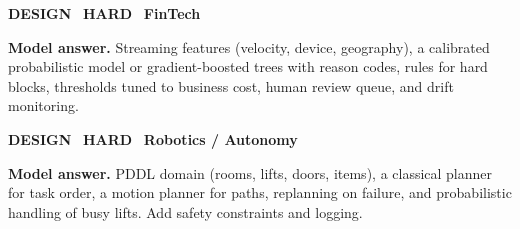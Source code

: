 \begin{tcolorbox}[enhanced,breakable,colback=white,colframe=crimson,arc=2mm,boxrule=0.8pt,left=3mm,right=3mm,
 title={\textbf{QIV.10}\quad Design a real-time fraud-scoring system that must explain its decisions.},fonttitle=\color{white}\small,colbacktitle=crimson]
\colorbox{crimson!15}{\scriptsize\bfseries\color{crimson} DESIGN}\
\colorbox{crimson!15}{\scriptsize\bfseries\color{crimson} HARD}\
\colorbox{navy!8}{\scriptsize\bfseries\color{navy} FinTech}\par\smallskip
\textbf{\color{navy}Model answer.} Streaming features (velocity, device, geography), a calibrated probabilistic model or gradient-boosted trees with reason codes, rules for hard blocks, thresholds tuned to business cost, human review queue, and drift monitoring.
\end{tcolorbox}
\begin{tcolorbox}[enhanced,breakable,colback=white,colframe=crimson,arc=2mm,boxrule=0.8pt,left=3mm,right=3mm,
 title={\textbf{QIV.11}\quad Design the task planner for a hospital delivery robot.},fonttitle=\color{white}\small,colbacktitle=crimson]
\colorbox{crimson!15}{\scriptsize\bfseries\color{crimson} DESIGN}\
\colorbox{crimson!15}{\scriptsize\bfseries\color{crimson} HARD}\
\colorbox{navy!8}{\scriptsize\bfseries\color{navy} Robotics / Autonomy}\par\smallskip
\textbf{\color{navy}Model answer.} PDDL domain (rooms, lifts, doors, items), a classical planner for task order, a motion planner for paths, replanning on failure, and probabilistic handling of busy lifts. Add safety constraints and logging.
\end{tcolorbox}